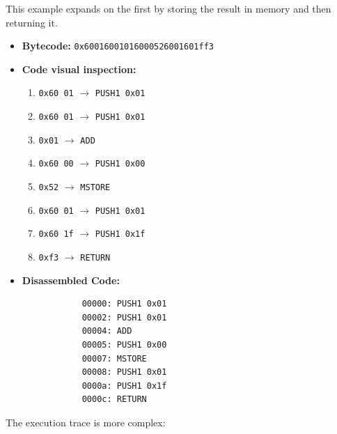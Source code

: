 \documentclass{scrbook}
\begin{document}
This example expands on the first by storing the result in memory and then returning it.

\begin{itemize}
    \item \textbf{Bytecode:} \texttt{0x60016001016000526001601ff3}

    \item \textbf{Code visual inspection:}
    \begin{enumerate}
        \item \texttt{0x60 01} $\longrightarrow$ \texttt{PUSH1 0x01}
        \item \texttt{0x60 01} $\longrightarrow$ \texttt{PUSH1 0x01}
        \item \texttt{0x01} $\longrightarrow$ \texttt{ADD}
        \item \texttt{0x60 00} $\longrightarrow$ \texttt{PUSH1 0x00}
        \item \texttt{0x52} $\longrightarrow$ \texttt{MSTORE}
        \item \texttt{0x60 01} $\longrightarrow$ \texttt{PUSH1 0x01}
        \item \texttt{0x60 1f} $\longrightarrow$ \texttt{PUSH1 0x1f}
        \item \texttt{0xf3} $\longrightarrow$ \texttt{RETURN}
    \end{enumerate}
    
    \item
        \textbf{Disassembled Code:}
        \begin{lstlisting}
            00000: PUSH1 0x01
            00002: PUSH1 0x01
            00004: ADD
            00005: PUSH1 0x00
            00007: MSTORE
            00008: PUSH1 0x01
            0000a: PUSH1 0x1f
            0000c: RETURN
        \end{lstlisting}
\end{itemize}

The execution trace is more complex:
\end{document}
